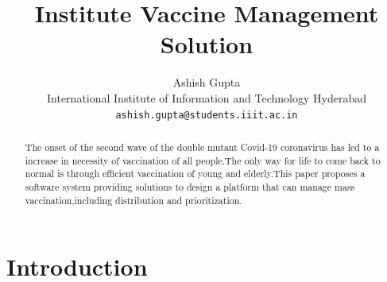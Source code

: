 \documentclass[10pt,twocolumn,letterpaper]{article}
\begin{document}
\title{Institute Vaccine Management Solution }

\author{Ashish Gupta\\
International Institute of Information and Technology Hyderabad\\
{\tt\small ashish.gupta@students.iiit.ac.in}
}

\maketitle

\begin{abstract}
   The onset of the second wave of the double  mutant Covid-19 coronavirus has led to a increase in necessity of vaccination of all people.The only way for life to come back to normal is through efficient vaccination of young and elderly.This paper proposes a software system providing solutions to design a platform that can manage mass vaccination,including distribution and prioritization.
\end{abstract}

\section{Introduction}
\end{document}
